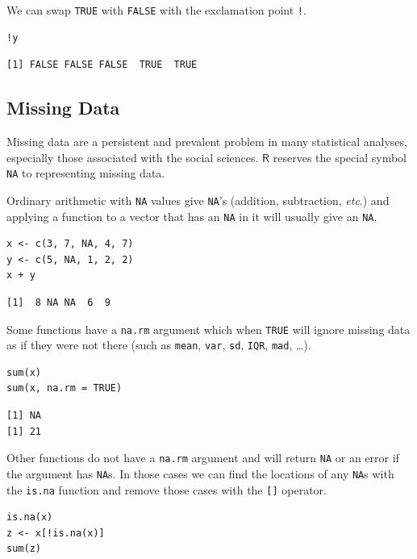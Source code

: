 \documentclass[10pt,english]{scrbook}
\begin{document}
We can swap \texttt{TRUE} with \texttt{FALSE} with the exclamation point \texttt{!}.

\begin{verbatim}
!y
\end{verbatim}

\begin{verbatim}
[1] FALSE FALSE FALSE  TRUE  TRUE
\end{verbatim}
\subsection[Missing Data]{Missing Data}
\label{sec-1-1-6}

Missing data are a persistent and prevalent problem in many statistical analyses, especially those associated with the social sciences. \(\mathsf{R}\) reserves the special symbol \texttt{NA} to representing missing data.

Ordinary arithmetic with \texttt{NA} values give \texttt{NA}'s (addition, subtraction, \emph{etc}.) and applying a function to a vector that has an \texttt{NA} in it will usually give an \texttt{NA}.

\begin{verbatim}
x <- c(3, 7, NA, 4, 7)
y <- c(5, NA, 1, 2, 2)
x + y
\end{verbatim}

\begin{verbatim}
[1]  8 NA NA  6  9
\end{verbatim}

Some functions have a \texttt{na.rm} argument which when \texttt{TRUE} will ignore missing data as if they were not there (such as \texttt{mean}, \texttt{var}, \texttt{sd}, \texttt{IQR}, \texttt{mad}, \ldots{}). 

\begin{verbatim}
sum(x)
sum(x, na.rm = TRUE)
\end{verbatim}

\begin{verbatim}
[1] NA
[1] 21
\end{verbatim}

Other functions do not have a \texttt{na.rm} argument and will return \texttt{NA} or an error if the argument has \texttt{NA}s. In those cases we can find the locations of any \texttt{NA}s with the \texttt{is.na} function and remove those cases with the \texttt{[]} operator.

\begin{verbatim}
is.na(x)
z <- x[!is.na(x)]
sum(z)
\end{verbatim}
\end{document}
